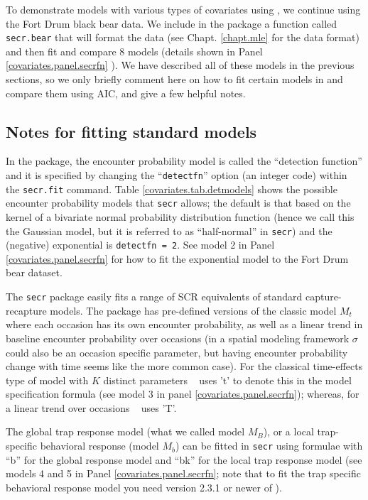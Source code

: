 To demonstrate
 models with various types of covariates using \secr, we
continue using the Fort Drum black bear data. 
We include in the \scrbook package a function called {\tt secr.bear}
that will format the data (see Chapt. \ref{chapt.mle} for the \secr
data format) and then fit and compare 8 models (details shown in Panel
\ref{covariates.panel.secrfn} ).  We have described all of these
models in the previous sections, so we only briefly comment here on
how to fit certain models in \secr and compare them using AIC, and
give a few helpful notes.

\subsection{Notes for fitting standard models}

In the \secr package, the encounter probability model is called the
``detection function'' and it is specified 
by changing the ``\mbox{\tt detectfn}'' option (an integer code)
within the \mbox{\tt secr.fit} command.  Table
\ref{covariates.tab.detmodels} shows the possible encounter
probability models 
that \mbox{\tt secr} allows; the default is that based on the kernel
of a bivariate normal probability distribution function
(hence we call this the Gaussian model, but it is referred to as
``half-normal'' 
in \mbox{\tt secr}) and the
(negative) exponential is \mbox{\tt detectfn = 2}.  See model 2 in 
Panel \ref{covariates.panel.secrfn} for how to fit the exponential 
model to the Fort Drum bear dataset. 

The \mbox{\tt secr} package easily fits a range of SCR equivalents of standard capture-recapture models.
The package has pre-defined versions of the classic
model $M_{t}$ where each
occasion has its own encounter
 probability, as well as a linear
trend in baseline encounter probability 
over occasions (in a spatial modeling framework $\sigma$ could also be
an occasion specific parameter, but having encounter probability 
 change with time seems like the more common case). For the classical
time-effects type of model with $K$ distinct parameters \secr~ uses 't' to denote
this in the model specification formula (see model 3 in 
panel \ref{covariates.panel.secrfn}); whereas, for a linear
trend over occasions \secr~ uses 'T'.

The global trap response model (what we called model $M_{B}$), 
or a local trap-specific behavioral response (model $M_{b}$)
can be fitted in \mbox{\tt secr} using formulae with
 ``b'' for the global response model and
 ``bk'' for the local trap response model
(see models 4 and 5 in 
Panel \ref{covariates.panel.secrfn}; note that to fit the trap specific behavioral response model you need version 2.3.1 or newer of \secr).

